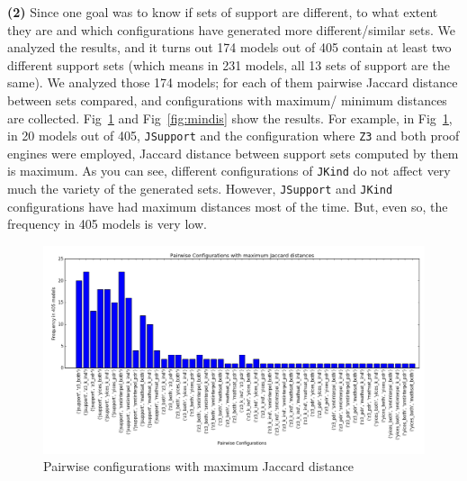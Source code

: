 \noindent{}
 \vspace{9pt}
 
\textbf{(2)} Since one goal was to know if sets of support are different, to what extent they are and which configurations have generated more different/similar sets. We analyzed the results, 
and it turns out 174 models out of 405 contain at least two different support sets (which means in 231 models, all 13 sets of support are the same). We analyzed those 174 models; for each of them pairwise Jaccard distance between sets compared, and configurations with maximum/ minimum distances are collected. Fig~\ref{fig:maxdis} and Fig~\ref{fig:mindis} show the results. For example, in Fig~\ref{fig:maxdis}, in 20 models out of 405, \texttt{JSupport} and the configuration where \texttt{Z3} and both proof engines were employed, Jaccard distance between support sets computed by them is maximum. As you can see, different configurations of \texttt{JKind} do not affect very much the variety of the generated sets. However, \texttt{JSupport} and \texttt{JKind} configurations have had maximum distances most of the time. But, even so, the frequency in 405 models is very low.


\begin{figure}
  \centering
  \includegraphics[width=\textwidth]{figs/max_settings_analyses.png}
  \caption{Pairwise configurations with maximum Jaccard distance}\label{fig:maxdis}
\end{figure}


